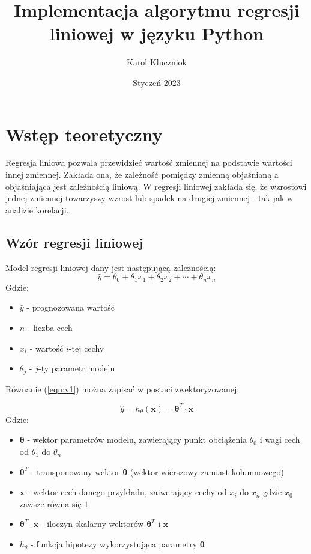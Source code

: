\documentclass{article}
\title{Implementacja algorytmu regresji liniowej w języku Python}
\author{Karol Kluczniok}
\date{Styczeń 2023}
\begin{document}
\maketitle


\let\oldref\ref
\renewcommand{\ref}[1]{(\oldref{#1})}


\section{Wstęp teoretyczny}

Regresja liniowa pozwala przewidzieć wartość zmiennej na podstawie wartości innej zmiennej. Zakłada ona, że zależność pomiędzy zmienną objaśnianą a objaśniająca jest zależnością liniową. W regresji liniowej zakłada się, że wzrostowi jednej zmiennej towarzyszy wzrost lub spadek na drugiej zmiennej - tak jak w analizie korelacji.

\subsection{Wzór regresji liniowej}
Model regresji liniowej dany jest następującą zależnością:
\begin{equation}
    \hat{y} = \theta_0 + \theta_1 x_1 + \theta_2 x _2 + \cdots + \theta_n x_n
\end{equation}
Gdzie:
\begin{itemize}
    \item $\hat{y}$ - prognozowana wartość
    \item $n$ - liczba cech
    \item $x_i$ - wartość $i$-tej cechy
    \item $\theta_j$ - $j$-ty parametr modelu
    \label{eqn:v1}
\end{itemize}

\noindent Równanie \ref{eqn:v1} można zapisać w postaci zwektoryzowanej:

\begin{equation}
    \hat{y} = h_\theta(\bm{x})=\bm{\theta}^T\cdot\bm{x}
\end{equation}
Gdzie:
\begin{itemize}
    \item $\bm{\theta}$ - wektor parametrów modelu, zawierający punkt obciążenia $\theta_0$ i wagi cech od $\theta_1$ do $\theta_n$
    \item $\bm{\theta}^T$ - transponowany wektor $\bm{\theta}$ (wektor wierszowy zamiast kolumnowego)
    \item $\bm{x}$ - wektor cech danego przykładu, zaiwerający cechy od $x_i$ do $x_n$ gdzie $x_0$ zawsze równa się $1$
    \item $\bm{\theta}^T \cdot \bm{x}$ - iloczyn skalarny wektorów $\bm{\theta}^T$ i $\bm{x}$
    \item $h_\theta$ - funkcja hipotezy wykorzystująca parametry $\bm{\theta}$
\end{itemize}
\end{document}
